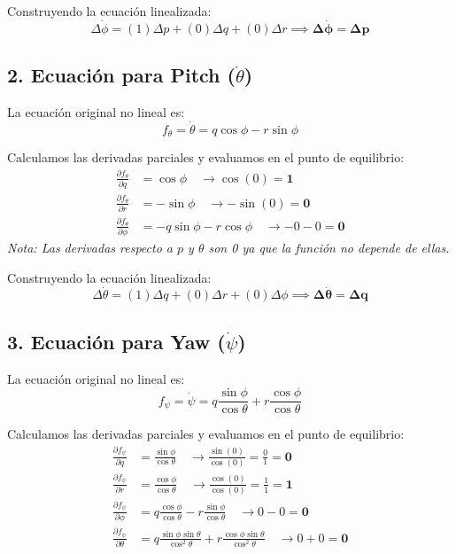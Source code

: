 \documentclass[12pt]{article}
\begin{document}
Construyendo la ecuación linealizada:
\begin{equation}
    \Delta\dot{\phi} = (1)\Delta p + (0)\Delta q + (0)\Delta r \implies \mathbf{\Delta\dot{\phi} = \Delta p}
\end{equation}

\subsection{2. Ecuación para Pitch ($\dot{\theta}$)}
La ecuación original no lineal es:
\begin{equation}
    f_{\theta} = \dot{\theta} = q \cos\phi - r \sin\phi
\end{equation}

Calculamos las derivadas parciales y evaluamos en el punto de equilibrio:
\begin{align*}
    \frac{\partial f_{\theta}}{\partial q} &= \cos\phi \quad \rightarrow \cos(0) = \mathbf{1} \\
    \frac{\partial f_{\theta}}{\partial r} &= -\sin\phi \quad \rightarrow -\sin(0) = \mathbf{0} \\
    \frac{\partial f_{\theta}}{\partial \phi} &= -q \sin\phi - r \cos\phi \quad \rightarrow -0 - 0 = \mathbf{0}
\end{align*}
\textit{Nota: Las derivadas respecto a $p$ y $\theta$ son 0 ya que la función no depende de ellas.}

Construyendo la ecuación linealizada:
\begin{equation}
    \Delta\dot{\theta} = (1)\Delta q + (0)\Delta r + (0)\Delta \phi \implies \mathbf{\Delta\dot{\theta} = \Delta q}
\end{equation}

\subsection{3. Ecuación para Yaw ($\dot{\psi}$)}
La ecuación original no lineal es:
\begin{equation}
    f_{\psi} = \dot{\psi} = q \frac{\sin\phi}{\cos\theta} + r \frac{\cos\phi}{\cos\theta}
\end{equation}

Calculamos las derivadas parciales y evaluamos en el punto de equilibrio:
\begin{align*}
    \frac{\partial f_{\psi}}{\partial q} &= \frac{\sin\phi}{\cos\theta} \quad \rightarrow \frac{\sin(0)}{\cos(0)} = \frac{0}{1} = \mathbf{0} \\
    \frac{\partial f_{\psi}}{\partial r} &= \frac{\cos\phi}{\cos\theta} \quad \rightarrow \frac{\cos(0)}{\cos(0)} = \frac{1}{1} = \mathbf{1} \\
    \frac{\partial f_{\psi}}{\partial \phi} &= q \frac{\cos\phi}{\cos\theta} - r \frac{\sin\phi}{\cos\theta} \quad \rightarrow 0 - 0 = \mathbf{0} \\
    \frac{\partial f_{\psi}}{\partial \theta} &= q \frac{\sin\phi \sin\theta}{\cos^2\theta} + r \frac{\cos\phi \sin\theta}{\cos^2\theta} \quad \rightarrow 0 + 0 = \mathbf{0}
\end{align*}
\end{document}
